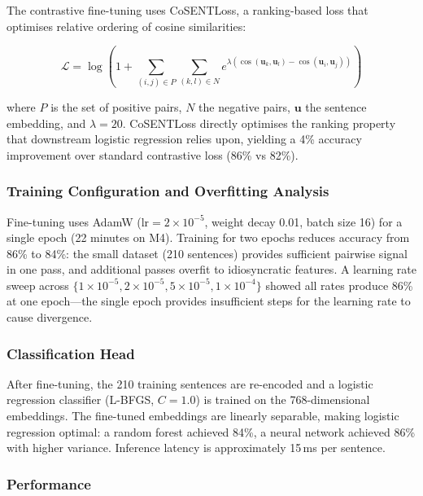 The contrastive fine-tuning uses CoSENTLoss, a ranking-based loss that optimises relative ordering of cosine similarities:

\begin{equation}
\mathcal{L} = \log \left(1 + \sum_{(i,j) \in P} \sum_{(k,l) \in N} e^{\lambda(\cos(\mathbf{u}_k, \mathbf{u}_l) - \cos(\mathbf{u}_i, \mathbf{u}_j))}\right)
\label{eq:cosent}
\end{equation}

\noindent where $P$ is the set of positive pairs, $N$ the negative pairs, $\mathbf{u}$ the sentence embedding, and $\lambda = 20$. CoSENTLoss directly optimises the ranking property that downstream logistic regression relies upon, yielding a 4\% accuracy improvement over standard contrastive loss (86\% vs 82\%).

\subsubsection{Training Configuration and Overfitting Analysis}

Fine-tuning uses AdamW ($\text{lr} = 2 \times 10^{-5}$, weight decay 0.01, batch size 16) for a single epoch (22 minutes on M4). Training for two epochs reduces accuracy from 86\% to 84\%: the small dataset (210 sentences) provides sufficient pairwise signal in one pass, and additional passes overfit to idiosyncratic features. A learning rate sweep across $\{1 \times 10^{-5}, 2 \times 10^{-5}, 5 \times 10^{-5}, 1 \times 10^{-4}\}$ showed all rates produce 86\% at one epoch---the single epoch provides insufficient steps for the learning rate to cause divergence.

\subsubsection{Classification Head}

After fine-tuning, the 210 training sentences are re-encoded and a logistic regression classifier (L-BFGS, $C = 1.0$) is trained on the 768-dimensional embeddings. The fine-tuned embeddings are linearly separable, making logistic regression optimal: a random forest achieved 84\%, a neural network achieved 86\% with higher variance. Inference latency is approximately 15\,ms per sentence.

\subsubsection{Performance}

